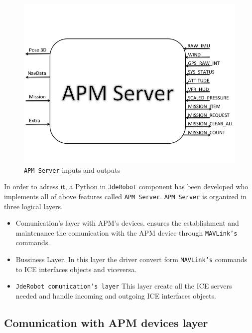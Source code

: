 \documentclass{llncs}
\begin{document}
\begin{figure}[h]
  \centering
  \includegraphics[scale=0.5]{img/diseno.jpg}
  \caption{\texttt{APM Server} inputs and outputs}
  \label{fig:diseno_apms_caja_negra}
\end{figure}

In order to adress it, a Python in \texttt{JdeRobot} component has been developed who implements all of above features called \texttt{APM Server}. 
\texttt{APM Server} is organized in three logical layers.
\begin{itemize}
\item Comunication's layer with APM's devices. ensures the establishment and maintenance the comunication with the APM device through \texttt{MAVLink's} commands.
\item Bussiness Layer. In this layer the driver convert form \texttt{MAVLink's} commands to ICE interfaces objects and viceversa.
\item \texttt{JdeRobot comunication's layer} This layer create all the ICE servers needed and handle incoming and outgoing ICE interfaces objects.
\end{itemize}


\subsection{Comunication with APM devices layer}
\label{sec:apm_comunication}
\end{document}
